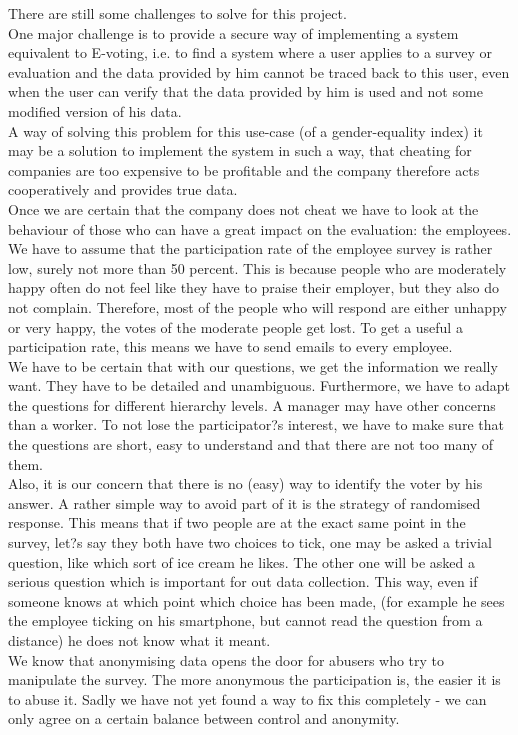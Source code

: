 There are still some challenges to solve for this project.\\[5pt]
One major challenge is to provide a secure way of implementing a system equivalent to E-voting, i.e. to find a system where a user applies to a survey or evaluation and the data provided by him cannot be traced back to this user, even when the user can verify that the data provided by him is used and not some modified version of his data.\\
A way of solving this problem for this use-case (of a gender-equality index) it may be a solution to implement the system in such a way, that cheating for companies are too expensive to be profitable and the company therefore acts cooperatively and provides true data.\\[5pt]
Once we are certain that the company does not cheat we have to look at the behaviour of those who can have a great impact on the evaluation: the employees.\\
We have to assume that the participation rate of the employee survey is rather low, surely not more than 50 percent. This is because people who are moderately happy often do not feel like they have to praise their employer, but they also do not complain. Therefore, most of the people who will respond are either unhappy or very happy, the votes of the moderate people get lost. To get a useful a participation rate, this means we have to send emails to every employee.\\
We have to be certain that with our questions, we get the information we really want. They have to be detailed and unambiguous. Furthermore, we have to adapt the questions for different hierarchy levels. A manager may have other concerns than a worker.
To not lose the participator?s interest, we have to make sure that the questions are short, easy to understand and that there are not too many of them.\\
Also, it is our concern that there is no (easy) way to identify the voter by his answer. A rather simple way to avoid part of it is the strategy of randomised response. This means that if two people are at the exact same point in the survey, let?s say they both have two choices to tick, one may be asked a trivial question, like which sort of ice cream he likes. The other one will be asked a serious question which is important for out data collection. This way, even if someone knows at which point which choice has been made, (for example he sees the employee ticking on his smartphone, but cannot read the question from a distance) he does not know what it meant.\\
We know that anonymising data opens the door for abusers who try to manipulate the survey. The more anonymous the participation is, the easier it is to abuse it. Sadly we have not yet found a way to fix this completely - we can only agree on a certain balance between control and anonymity.\\

